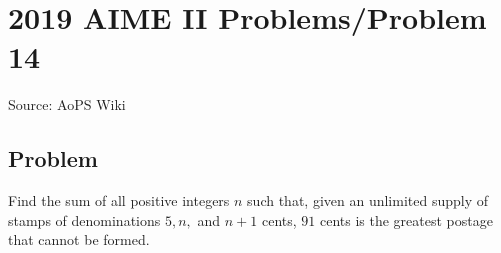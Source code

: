 \documentclass[12pt]{article}
\begin{document}
\section*{{2019 AIME II Problems/Problem 14}}
Source: AoPS Wiki

\subsection*{Problem}
Find the sum of all positive integers $n$ such that, given an unlimited supply of stamps of denominations $5,n,$ and $n+1$ cents, $91$ cents is the greatest postage that cannot be formed.
\end{document}
